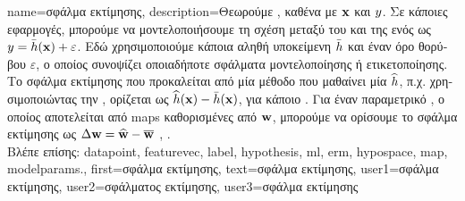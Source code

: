 {name={\foreignlanguage{greek}{σφάλμα εκτίμησης}},
	description={\foreignlanguage{greek}{Θεωρούμε} , 
		\foreignlanguage{greek}{καθένα με}  ${\bf x}$ \foreignlanguage{greek}{και}  
		$y$. \foreignlanguage{greek}{Σε κάποιες εφαρμογές, μπορούμε να μοντελοποιήσουμε τη σχέση μεταξύ του}  
		\foreignlanguage{greek}{και της}  \foreignlanguage{greek}{ενός}  \foreignlanguage{greek}{ως} 
		$y = \bar{h}({\bf x}) + \varepsilon$. \foreignlanguage{greek}{Εδώ χρησιμοποιούμε κάποια αληθή υποκείμενη}
		 $\bar{h}$ \foreignlanguage{greek}{και έναν όρο θορύβου $\varepsilon$, 
		ο οποίος συνοψίζει οποιαδήποτε σφάλματα μοντελοποίησης ή ετικετοποίησης. Το σφάλμα εκτίμησης που προκαλείται από μία μέθοδο} 
		 \foreignlanguage{greek}{που μαθαίνει μία}  $\widehat{h}$, 
		\foreignlanguage{greek}{π.χ. χρησιμοποιώντας την} , \foreignlanguage{greek}{ορίζεται ως  
		$\widehat{h}({\bf x}) - \bar{h}({\bf x})$, για κάποιο} . 
		\foreignlanguage{greek}{Για έναν παραμετρικό} , \foreignlanguage{greek}{ο οποίος αποτελείται από} \gls{map}s
		 \foreignlanguage{greek}{καθορισμένες από}  ${\bf w}$, 
		\foreignlanguage{greek}{μπορούμε να ορίσουμε το σφάλμα εκτίμησης ως} $\Delta {\bf w} = \widehat{{\bf w}} - \overline{{\bf w}}$ 
		\cite{hastie01statisticallearning}, \cite{kay}.\\
		\foreignlanguage{greek}{Βλέπε επίσης:} \gls{datapoint}, \gls{featurevec}, \gls{label}, \gls{hypothesis}, \gls{ml}, \gls{erm}, \gls{hypospace}, 
		\gls{map}, \glspl{modelparam}.},
	first={\foreignlanguage{greek}{σφάλμα εκτίμησης}},
	text={\foreignlanguage{greek}{σφάλμα εκτίμησης}},
	user1={\foreignlanguage{greek}{σφάλμα εκτίμησης}}, %
    	user2={\foreignlanguage{greek}{σφάλματος εκτίμησης}}, %
	user3={\foreignlanguage{greek}{σφάλμα εκτίμησης}} %
}

